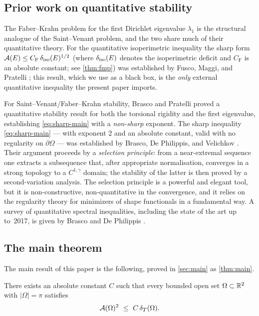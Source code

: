 \subsection*{Prior work on quantitative stability}

The Faber--Krahn problem for the first Dirichlet eigenvalue $\lambda_1$
is the structural analogue of the Saint--Venant problem, and the two
share much of their quantitative theory.  For the quantitative
isoperimetric inequality the sharp form
$\mathcal{A}(E)\le C_{\mathrm{F}}\,\delta_{\mathrm{iso}}(E)^{1/2}$ (where $\delta_{\mathrm{iso}}(E)$ denotes the
isoperimetric deficit and $C_{\mathrm F}$ is an absolute constant; see
\cref{thm:fmp}) was established by Fusco, Maggi, and Pratelli
\cite{FMP2008}; this result, which we use as a black box, is the
\emph{only} external quantitative inequality the present paper imports.

For Saint--Venant/Faber--Krahn stability, Brasco and Pratelli
\cite{BrascoPratelli2012} proved a quantitative stability result for
both the torsional rigidity and the first eigenvalue, establishing
\eqref{eq:sharp-main} with a \emph{non-sharp} exponent.  The sharp
inequality \eqref{eq:sharp-main} --- with exponent $2$ and an absolute
constant, valid with no regularity on $\partial\Omega$ --- was
established by Brasco, De Philippis, and Velichkov \cite{BDV2015}.
Their argument proceeds by a \emph{selection principle}: from a
near-extremal sequence one extracts a subsequence that, after
appropriate normalisation, converges in a strong topology to a
$C^{1,\gamma}$ domain; the stability of the latter is then proved by a
second-variation analysis.  The selection principle is a powerful and
elegant tool, but it is non-constructive, non-quantitative in the
convergence, and it relies on the regularity theory for minimizers of
shape functionals in a fundamental way.  A survey of quantitative
spectral inequalities, including the state of the art up to~2017, is
given by Brasco and De Philippis \cite{BrascoDePhilippis2017}.

\subsection*{The main theorem}

The main result of this paper is the following, proved in \cref{sec:main}
as \cref{thm:main}.

\begin{theorem}
  There exists an absolute constant $C$ such that every bounded open set
  $\Omega\subset\mathbb{R}^2$ with $|\Omega|=\pi$ satisfies
  \[
    \AF(\Omega)^2\ \le\ C\,\dT(\Omega).
  \]
\end{theorem}

